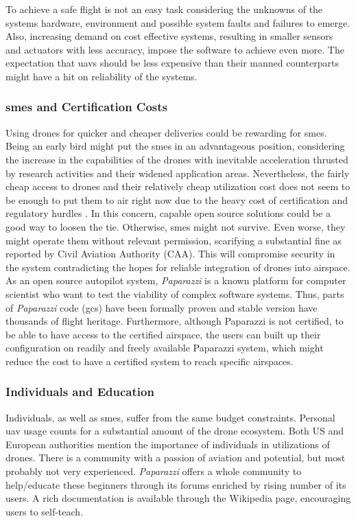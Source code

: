 To achieve a safe flight is not an easy task considering the unknowns of the systems hardware, environment and possible system faults and failures to emerge. Also, increasing demand on cost effective systems, resulting in smaller sensors and actuators with less accuracy, impose the software to achieve even more. The expectation that \gls{uav}s should be less expensive than their manned counterparts might have a hit on reliability of the systems. 

\subsubsection{\gls{sme}s and Certification Costs}

Using drones for quicker and cheaper deliveries could be rewarding for \gls{sme}s. Being an early bird might put the \gls{sme}s in an advantageous position, considering the increase in the capabilities of the drones with inevitable acceleration thrusted by research activities and their widened application areas. 
Nevertheless, the fairly cheap access to drones and their relatively cheap utilization cost does not seem to be enough to put them to air right now due to the heavy cost of certification and regulatory hurdles \cite{UAVreliabilityStudy}. In this concern, capable open source solutions could be a good way to loosen the tie.  Otherwise, \gls{sme}s might not survive. Even worse, they might operate them without relevant permission, scarifying a substantial fine as reported by Civil Aviation Authority (CAA). This will compromise security in the system contradicting the hopes for reliable integration of drones into airspace. As an open source autopilot system, \emph{Paparazzi} is a known platform for computer scientist who want to test the viability of complex software systems. Thus, parts of \emph{Paparazzi} code (\gls{gcs}) have been formally proven \cite{pprz_formal_proof} and stable version have thousands of flight heritage. Furthermore, although Paparazzi is not certified, to be able to have access to the certified airspace, the users can built up their configuration on readily and freely available Paparazzi system, which might reduce the cost to have a certified system to reach specific airspaces.

\subsubsection{Individuals and Education}

Individuals, as well as \gls{sme}s, suffer from the same budget constraints. Personal \gls{uav} usage counts for a substantial amount of the drone ecosystem.  Both US and European authorities mention the importance of individuals in utilizations of drones. There is a community with a passion of aviation and potential, but most probably not very experienced. \emph{Paparazzi} offers a whole community to help/educate these beginners through its forums enriched by rising number of its users.  A rich documentation is available through the Wikipedia page, encouraging users to self-teach.  

